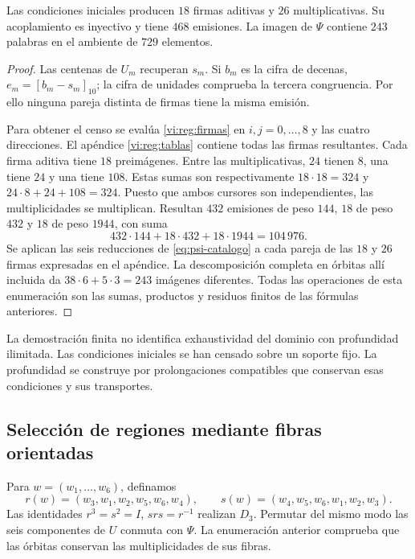 \begin{proposition}
\label{vi:reg:censo}
Las condiciones iniciales producen \(18\) firmas aditivas y \(26\)
multiplicativas. Su acoplamiento es inyectivo y tiene \(468\)
emisiones. La imagen de \(\Psi\) contiene \(243\) palabras en el
ambiente de \(729\) elementos.
\end{proposition}
\begin{proof}
Las centenas de \(U_m\) recuperan \(s_m\). Si \(b_m\) es la
cifra de decenas, \(e_m=[b_m-s_m]_{10}\); la cifra de unidades
comprueba la tercera congruencia. Por ello ninguna pareja distinta
de firmas tiene la misma emisión.

Para obtener el censo se evalúa \eqref{vi:reg:firmas} en
\(i,j=0,\ldots,8\) y las cuatro direcciones. El apéndice
\ref{vi:reg:tablas} contiene todas las firmas resultantes. Cada
firma aditiva tiene \(18\) preimágenes. Entre las multiplicativas,
\(24\) tienen \(8\), una tiene \(24\) y una tiene \(108\).
Estas sumas son respectivamente \(18\cdot18=324\) y
\(24\cdot8+24+108=324\). Puesto que ambos cursores son
independientes, las multiplicidades se multiplican. Resultan
\(432\) emisiones de peso \(144\), \(18\) de peso \(432\) y
\(18\) de peso \(1944\), con suma
\[
 432\cdot144+18\cdot432+18\cdot1944=104\,976.
\]
Se aplican las seis reducciones de \eqref{eq:psi-catalogo} a cada pareja
de las \(18\) y \(26\) firmas expresadas en el apéndice. La
descomposición completa en órbitas allí incluida da
\(38\cdot6+5\cdot3=243\) imágenes diferentes. Todas las
operaciones de esta enumeración son las sumas, productos y residuos
finitos de las fórmulas anteriores.
\end{proof}

La demostración finita no identifica exhaustividad del dominio con
profundidad ilimitada. Las condiciones iniciales se han censado sobre
un soporte fijo. La profundidad se construye por prolongaciones
compatibles que conservan esas condiciones y sus transportes.



\subsection{Selección de regiones mediante fibras orientadas}

Para \(w=(w_1,\ldots,w_6)\), definamos
\[
 r(w)=(w_3,w_1,w_2,w_5,w_6,w_4),\qquad
 s(w)=(w_4,w_5,w_6,w_1,w_2,w_3).
\]
Las identidades \(r^3=s^2=I\), \(srs=r^{-1}\) realizan
\(D_3\). Permutar del mismo modo las seis componentes de \(U\)
conmuta con \(\Psi\). La enumeración anterior comprueba que las
órbitas conservan las multiplicidades de sus fibras.

